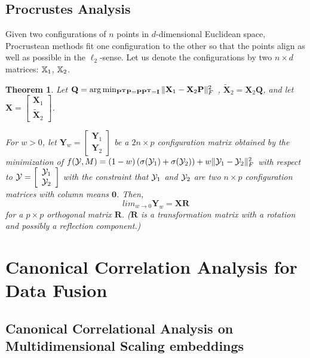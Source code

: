\documentclass[12pt,oneside,final]{thesis}\usepackage[]{graphicx}\usepackage[]{color}
\newtheorem{thm}{Theorem}
\begin{document}
\section{Procrustes Analysis}
Given two configurations of $n$ points in $d$-dimensional Euclidean space, Procrustean methods fit one configuration to the other so that the points align as well as possible in the $\ell_2$-sense. Let us denote the configurations by two $n \times d$ matrices: ${\mathbb{X}}_1$, ${\mathbb{X}}_2$. 
\begin{thm}
Let  $\mathbf{Q}=\arg\min_{\mathbf{P^T}\mathbf{P}=\mathbf{P}\mathbf{P^T}=\mathbf{I}}\|{\mathbf{X}_1-\mathbf{X}_2}\mathbf{P}\|_{F}^2$ ,   $\mathbf{\tilde{X}}_2= \mathbf{X}_2\mathbf{Q}$, 
and let  
$\mathbf{X}=\left[\begin{array}{c}
\mathbf{X}_1\\
\mathbf{\tilde{X}}_2
\end{array}\right]$.

For $w>0$, let $\mathbf{Y}_{w} = \left[\begin{array}{c}
\mathbf{Y}_1\\
\mathbf{Y}_2
\end{array}\right]$  be  a $2n \times p$ configuration matrix obtained by the minimization of 
$ f(\mathcal{Y}, M) =(1-w)\left({\sigma{(\mathcal{Y}_1)}}+{\sigma{(\mathcal{Y}_2)}}\right)+w\|{\mathcal{Y}_1-\mathcal{Y}_2}\|_{F}^2 $ with respect to  $\mathcal{Y}=\left[\begin{array}{c}
\mathcal{Y}_1\\
\mathcal{Y}_2
\end{array}\right]$ with the constraint that $\mathcal{Y}_1$ and $\mathcal{Y}_2$ are two $n \times p$ configuration matrices with column means $\bm{0}$. Then, $$lim_{w\rightarrow0}\mathbf{Y}_{w}=\mathbf{X}\mathbf{R}$$ for a $p\times p$ orthogonal matrix $\mathbf{R}$. ($\mathbf{R}$ is a transformation matrix with a rotation and possibly a reflection component.)
\end{thm}
 



\chapter{Canonical Correlation Analysis for Data Fusion}
\label{chap:CCA}

\section{Canonical Correlational Analysis on \\ Multidimensional Scaling embeddings\label{sec:CCA}}
\end{document}
